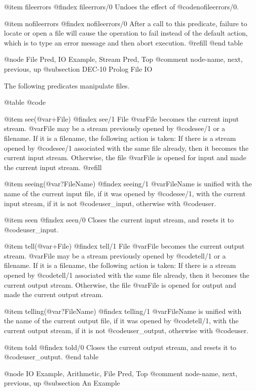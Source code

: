 @item fileerrors
@findex fileerrors/0
Undoes the effect of @code{nofileerrors/0}.

@item nofileerrors
@findex nofileerrors/0
After a call to this predicate, failure to locate or open a file will
cause the operation to fail instead of the default action, which is to
type an error message and then abort execution. @refill
@end table

@node File Pred, IO Example, Stream Pred, Top
@comment  node-name,  next,  previous,  up
@subsection DEC-10 Prolog File IO

The following predicates manipulate files.

@table @code

@item see(@var{+File})
@findex see/1
File @var{File} becomes the current input stream.  @var{File} may
be a stream previously opened by @code{see/1} or a filename.  If it is a
filename, the following action is taken: If there is a stream 
opened by @code{see/1} associated with the same file already, then it
becomes the current input stream.  Otherwise, the file @var{File}
is opened for input and made the current input stream. @refill

@item seeing(@var{?FileName})
@findex seeing/1
@var{FileName} is unified with the name of the current input file, if it
was opened by @code{see/1}, with the current input stream, if it is not
@code{user_input}, otherwise with @code{user}.

@item seen
@findex seen/0
Closes the current input stream, and resets it to @code{user_input}.

@item tell(@var{+File})
@findex tell/1
File @var{File} becomes the current output stream.  @var{File} may
be a stream previously opened by @code{tell/1} or a filename.  If it is a
filename, the following action is taken: If there is a stream 
opened by @code{tell/1} associated with the same file already, then it
becomes the current output stream.  Otherwise, the file @var{File}
is opened for output and made the current output stream.

@item telling(@var{?FileName})
@findex telling/1
@var{FileName} is unified with the name of the current output file, if
it was opened by @code{tell/1}, with the current output stream, if
it is not @code{user_output}, otherwise with @code{user}.

@item told
@findex told/0
Closes the current output stream, and resets it to @code{user_output}.
@end table

@node IO Example, Arithmetic, File Pred, Top
@comment  node-name,  next,  previous,  up
@subsection An Example

